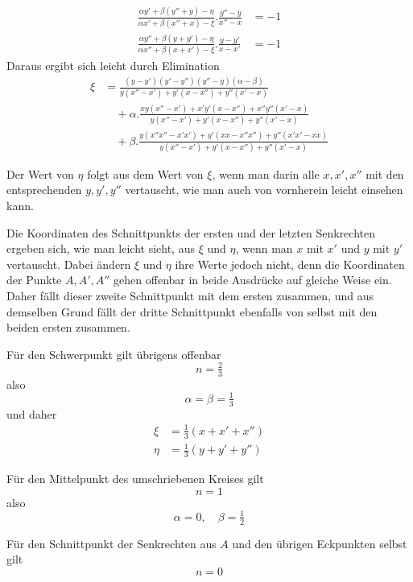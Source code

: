 %
\[
\begin{aligned}
\tfrac{\alpha y'+\beta(y''+y)-\eta}{\alpha x'+\beta(x''+x)-\xi}.\tfrac{y''-y}{x''-x}&=-1\\
\tfrac{\alpha y''+\beta(y+y')-\eta}{\alpha x''+\beta(x+x')-\xi}.\tfrac{y-y'}{x-x'}&=-1
\end{aligned}
\]
Daraus ergibt sich leicht durch Elimination
\[
\begin{aligned}
\xi&=\tfrac{(y-y')(y'-y'')(y''-y)(\alpha-\beta)}{y(x''-x')+y'(x-x'')+y''(x'-x)}\\
&\quad+\alpha.\tfrac{xy(x''-x')+x'y'(x-x'')+x''y''(x'-x)}{y(x''-x')+y'(x-x'')+y''(x'-x)}\\
&\quad+\beta.\tfrac{y(x''x''-x'x')+y'(xx-x''x'')+y''(x'x'-xx)}{y(x''-x')+y'(x-x'')+y''(x'-x)}
\end{aligned}
\]
\par
Der Wert von \(\eta\) folgt aus dem Wert von \(\xi\), wenn man darin alle \(x,x',x''\) mit den entsprechenden \(y,y',y''\) vertauscht, wie man auch von vornherein leicht einsehen kann.

Die Koordinaten des Schnittpunkts der ersten und der letzten Senkrechten ergeben sich, wie man leicht sieht, aus \(\xi\) und \(\eta\), wenn man \(x\) mit \(x'\) und \(y\) mit \(y'\) vertauscht. Dabei ändern \(\xi\) und \(\eta\) ihre Werte jedoch nicht, denn die Koordinaten der Punkte \(A,A',A''\) gehen offenbar in beide Ausdrücke auf gleiche Weise ein. Daher fällt dieser zweite Schnittpunkt mit dem ersten zusammen, und aus demselben Grund fällt der dritte Schnittpunkt ebenfalls von selbst mit den beiden ersten zusammen.

Für den Schwerpunkt gilt übrigens offenbar
\[
n=\tfrac23
\]
also
\[
\alpha=\beta=\tfrac13
\]
und daher
\[
\begin{aligned}\xi&=\tfrac13(x+x'+x'')\\\eta&=\tfrac13(y+y'+y'')\end{aligned}
\]
\par
Für den Mittelpunkt des umschriebenen Kreises gilt
\[
n=1
\]
also
\[
\alpha=0,\quad\beta=\tfrac12
\]
\par
Für den Schnittpunkt der Senkrechten aus \(A\) und den übrigen Eckpunkten selbst gilt
\[
n=0
\]
